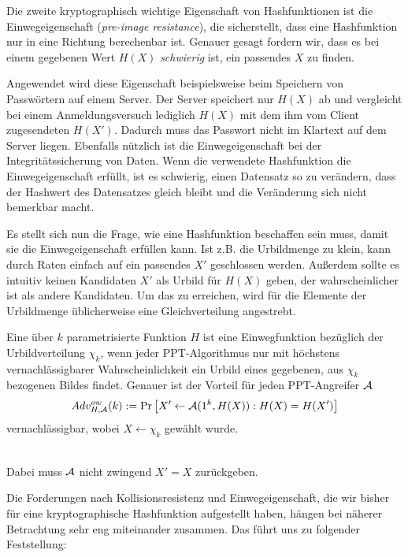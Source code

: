 Die zweite kryptographisch wichtige Eigenschaft von Hashfunktionen ist die Einwegeigenschaft (\textit{pre-image resistance}), die sicherstellt,
dass eine Hashfunktion nur in eine Richtung berechenbar ist. Genauer gesagt fordern wir, dass es bei einem gegebenen Wert $H(X)$ \emph{schwierig} ist, ein
passendes $X$ zu finden.

Angewendet wird diese Eigenschaft beispielsweise beim Speichern von Passwörtern auf einem Server. Der Server speichert nur $H(X)$ ab und vergleicht bei
einem Anmeldungsversuch lediglich $H(X)$ mit dem ihm vom Client zugesendeten $H(X')$. Dadurch muss das Passwort nicht im Klartext auf dem Server liegen.
Ebenfalls nützlich ist die Einwegeigenschaft bei der Integritätssicherung von Daten. Wenn die verwendete Hashfunktion die Einwegeigenschaft erfüllt, ist
es schwierig, einen Datensatz so zu verändern, dass der Hashwert des Datensatzes gleich bleibt und die Veränderung sich nicht bemerkbar macht.

Es stellt sich nun die Frage, wie eine Hashfunktion beschaffen sein muss, damit sie die Einwegeigenschaft erfüllen kann. Ist z.B. die Urbildmenge zu klein, kann
durch Raten einfach auf ein passendes $X'$ geschlossen werden. Außerdem sollte es intuitiv keinen Kandidaten $X'$ als Urbild für $H(X)$ geben, der
wahrscheinlicher ist als andere Kandidaten. Um das zu erreichen, wird für die Elemente der Urbildmenge üblicherweise eine Gleichverteilung angestrebt.
\vspace{10pt}

\begin{definition}[Einwegfunktion]
Eine über $k$ parametrisierte Funktion $H$ ist eine Einwegfunktion bezüglich der Urbildverteilung $\chi_k$, wenn jeder PPT-Algorithmus nur mit höchstens
vernachlässigbarer Wahrscheinlichkeit ein Urbild eines gegebenen, aus $\chi_k$ bezogenen Bildes findet. Genauer ist der Vorteil für jeden PPT-Angreifer $\mathcal{A}$
\begin{equation*}
Adv^{ow}_{H,\mathcal{A}}(k):= \Pr \left[ X' \leftarrow \mathcal{A}(1^k,H(X)) : H(X) = H(X')\right]
\end{equation*}
vernachlässigbar, wobei $X \leftarrow \chi_k$ gewählt wurde.
\end{definition}

~\\
Dabei muss $\mathcal{A}$ nicht zwingend $X' = X$ zurückgeben.

Die Forderungen nach Kollisionsresistenz und Einwegeigenschaft, die wir bisher für eine kryptographische Hashfunktion aufgestellt haben, hängen bei näherer
Betrachtung sehr eng miteinander zusammen. Das führt uns zu folgender Feststellung:
\vspace{10pt}

